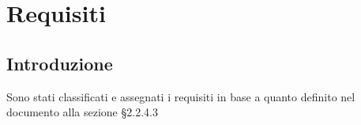 \section{Requisiti}

\subsection{Introduzione} 

Sono stati classificati e assegnati i requisiti in base a quanto definito nel documento \NdP{} alla sezione §2.2.4.3


\vspace{0.5cm}

\vspace{0.5cm}

\vspace{0.8cm}

